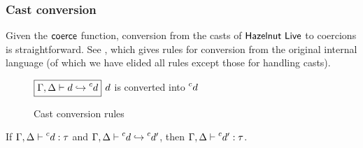\documentclass[index.tex]{subfiles}
\begin{document}
\subsubsection{Cast conversion}
Given the $\coerce$ function, conversion from the casts of $\HazelnutLive$ to coercions is
straightforward. See , which gives rules for conversion from the
original internal language (of which we have elided all rules except those for handling casts).

\begin{figure}[htb!]
  $\judgbox{\ctxConvertsInto{\andCtx{\ctx}{\holeCtx}}{\IEMVO}{\IEMV}}$ $\IEMVO$ is converted into $\IEMV$
  
  \begin{mathpar}
  \end{mathpar}
  \caption{Cast conversion rules}
  \label{fig:coercion-conversion}
\end{figure}

\begin{theorem}[name=Cast conversion]
  If $\ctxAssignType{\andCtx{\ctx}{\holeCtx}}{\IEMV}{\TMV}$ and
  $\ctxConvertsInto{\andCtx{\ctx}{\holeCtx}}{\IEMV}{\IEMV'}$, then
  $\ctxAssignType{\andCtx{\ctx}{\holeCtx}}{\IEMV'}{\TMV}$.
\end{theorem}
 
\end{document}
